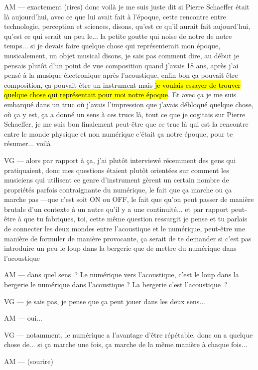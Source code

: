 AM — exactement (rires) donc voilà je me suis juste dit si Pierre Schaeffer était là aujourd'hui, avec ce que lui avait fait à l'époque, cette rencontre entre technologie, perception et sciences, disons, qu'est ce qu'il aurait fait aujourd'hui, qu'est ce qui serait un peu le... la petite goutte qui noise de notre de notre temps... si je devais faire quelque chose qui représenterait mon époque, musicalement, un objet musical disons, je sais pas comment dire, au début je pensais plutôt d'un point de vue composition quand j'avais 18 ans, après j'ai pensé à la musique électronique après l'acoustique, enfin bon ça pouvait être composition, ça pouvait être un instrument mais \hl{je voulais essayer de trouver quelque chose qui représentait pour moi notre époque}. Et avec ça je me suis embarqué dans un truc où j'avais l'impression que j'avais débloqué quelque chose, où ça y est, ça a donné un sens à ces trucs là, tout ce que je cogitais sur Pierre Schaeffer, je me suis bon finalement peut-être que ce truc là qui est la rencontre entre le monde physique et non numérique c'était ça notre époque, pour te résumer... voilà

VG — alors par rapport à ça, j'ai plutôt interviewé récemment des gens qui pratiquaient, donc mes questions étaient plutôt orientées sur comment les musiciens qui utilisent ce genre d'instrument gèrent un certain nombre de propriétés parfois contraignante du numérique, le fait que ça marche ou ça marche pas —que c'est soit ON ou OFF, le fait que qu'on peut passer de manière brutale d'un contexte à un autre qu'il y a une continuité... et par rapport peut-être à que tu fabriques, toi, cette même question ressurgit je pense et tu parlais de connecter les deux mondes entre l'acoustique et le numérique, peut-être une manière de formuler de manière provocante, ça serait de te demander si c'est pas introduire un peu le loup dans la bergerie que de mettre du numérique dans l'acoustique 

AM — dans quel sens ? Le numérique vers l'acoustique, c'est le loup dans la bergerie le numérique dans l'acoustique ? La bergerie c'est l'acoustique ?

VG — je sais pas, je pense que ça peut jouer dans les deux sens... 

AM — oui... 

VG — notamment, le numérique a l'avantage d'être répétable, donc on a quelque chose de... si ça marche une fois, ça marche de la même manière à chaque fois... 

AM — (sourire)

